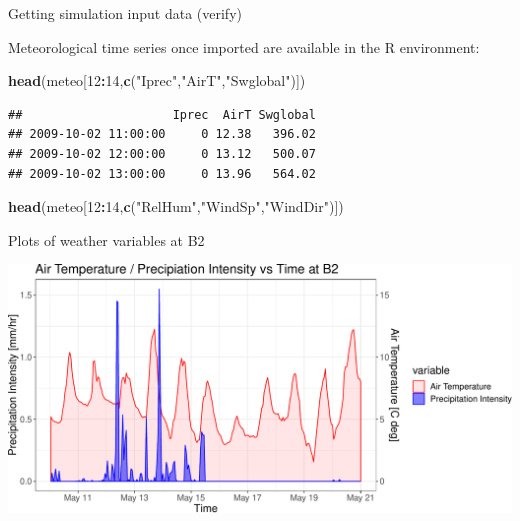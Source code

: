 \documentclass[ignorenonframetext,]{beamer}
\newenvironment{Shaded}{\begin{snugshade}}{\end{snugshade}}
\newcommand{\KeywordTok}[1]{\textcolor[rgb]{0.13,0.29,0.53}{\textbf{#1}}}
\newcommand{\DecValTok}[1]{\textcolor[rgb]{0.00,0.00,0.81}{#1}}
\newcommand{\StringTok}[1]{\textcolor[rgb]{0.31,0.60,0.02}{#1}}
\newcommand{\OperatorTok}[1]{\textcolor[rgb]{0.81,0.36,0.00}{\textbf{#1}}}
\newcommand{\NormalTok}[1]{#1}
\begin{document}
\begin{frame}[fragile]{Getting simulation input data (verify)}

Meteorological time series once imported are available in the R
environment:

\begin{Shaded}
\begin{Highlighting}[]
\KeywordTok{head}\NormalTok{(meteo[}\DecValTok{12}\OperatorTok{:}\DecValTok{14}\NormalTok{,}\KeywordTok{c}\NormalTok{(}\StringTok{"Iprec"}\NormalTok{,}\StringTok{"AirT"}\NormalTok{,}\StringTok{"Swglobal"}\NormalTok{)])}
\end{Highlighting}
\end{Shaded}

\begin{verbatim}
##                     Iprec  AirT Swglobal
## 2009-10-02 11:00:00     0 12.38   396.02
## 2009-10-02 12:00:00     0 13.12   500.07
## 2009-10-02 13:00:00     0 13.96   564.02
\end{verbatim}

\begin{Shaded}
\begin{Highlighting}[]
\KeywordTok{head}\NormalTok{(meteo[}\DecValTok{12}\OperatorTok{:}\DecValTok{14}\NormalTok{,}\KeywordTok{c}\NormalTok{(}\StringTok{"RelHum"}\NormalTok{,}\StringTok{"WindSp"}\NormalTok{,}\StringTok{"WindDir"}\NormalTok{)])}
\end{Highlighting}
\end{Shaded}

\end{frame}

\begin{frame}{Plots of weather variables at B2}

\includegraphics{presentation_files/figure-beamer/unnamed-chunk-5-1.pdf}

\end{frame}
\end{document}
